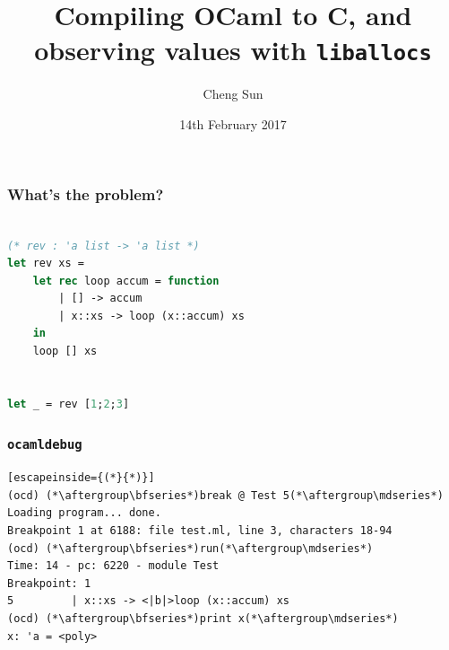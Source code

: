\documentclass[xcolor={usenames,dvipsnames,svgnames,table}]{beamer}
\title[Compiling OCaml to C]{Compiling OCaml to C, and observing values with \lstinline{liballocs}} %
\author{Cheng Sun} %
\institute[]{
CST Part II Project
}
\date{14th February 2017}
\begin{document}
\begin{frame}
\titlepage %
\end{frame}



\begin{frame}[fragile]
\frametitle{What's the problem?}

\begin{lstlisting}[language=ML,morekeywords={function}]

(* rev : 'a list -> 'a list *)
let rev xs =
    let rec loop accum = function
        | [] -> accum
        | x::xs -> loop (x::accum) xs
    in
    loop [] xs


let _ = rev [1;2;3]
\end{lstlisting}

\end{frame}


\begin{frame}[fragile]
  \frametitle{\lstinline{ocamldebug}}

  \begin{lstlisting}[escapeinside={(*}{*)}]
(ocd) (*\aftergroup\bfseries*)break @ Test 5(*\aftergroup\mdseries*)
Loading program... done.
Breakpoint 1 at 6188: file test.ml, line 3, characters 18-94
(ocd) (*\aftergroup\bfseries*)run(*\aftergroup\mdseries*)
Time: 14 - pc: 6220 - module Test
Breakpoint: 1
5         | x::xs -> <|b|>loop (x::accum) xs
(ocd) (*\aftergroup\bfseries*)print x(*\aftergroup\mdseries*)
x: 'a = <poly>
  \end{lstlisting}

\end{frame}

\end{document}
